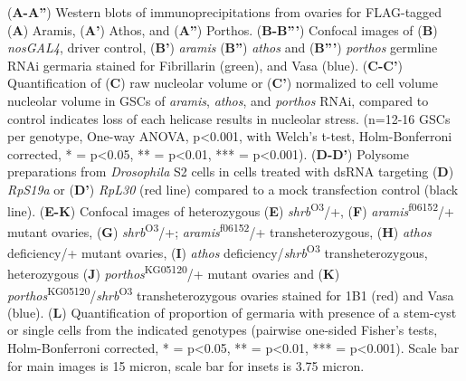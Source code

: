 \documentclass[12pt,oneside]{reedthesis}
\begin{document}
(\textbf{A-A''})
Western blots of immunoprecipitations from ovaries for FLAG-tagged
(\textbf{A}) Aramis, (\textbf{A'}) Athos, and (\textbf{A''}) Porthos. (\textbf{B-B'''})
Confocal images of (\textbf{B}) \emph{nosGAL4}, driver control, (\textbf{B'}) \emph{aramis}
(\textbf{B''}) \emph{athos} and (\textbf{B'''}) \emph{porthos} germline RNAi germaria
stained for Fibrillarin (green), and Vasa (blue). (\textbf{C-C'})
Quantification of (\textbf{C}) raw nucleolar volume or (\textbf{C'}) normalized to
cell volume nucleolar volume in GSCs of \emph{aramis}, \emph{athos}, and \emph{porthos}
RNAi, compared to control indicates loss of each helicase results in
nucleolar stress. (n=12-16 GSCs per genotype, One-way ANOVA, p\textless0.001,
with Welch's t-test, Holm-Bonferroni corrected, * = p\textless0.05, ** =
p\textless0.01, *** = p\textless0.001). (\textbf{D-D'}) Polysome preparations from
\emph{Drosophila} S2 cells in cells treated with dsRNA targeting (\textbf{D})
\emph{RpS19a} or (\textbf{D'}) \emph{RpL30} (red line) compared to a mock transfection
control (black line). (\textbf{E-K}) Confocal images of heterozygous (\textbf{E})
\emph{shrb}\textsuperscript{O3}/+, (\textbf{F}) \emph{aramis}\textsuperscript{f06152}/+ mutant ovaries, (\textbf{G})
\emph{shrb}\textsuperscript{O3}/+; \emph{aramis}\textsuperscript{f06152}/+ transheterozygous, (\textbf{H}) \emph{athos}
deficiency/+ mutant ovaries, (\textbf{I}) \emph{athos} deficiency/\emph{shrb}\textsuperscript{O3}
transheterozygous, heterozygous (\textbf{J}) \emph{porthos}\textsuperscript{KG05120}/+ mutant
ovaries and (\textbf{K}) \emph{porthos}\textsuperscript{KG05120}/\emph{shrb}\textsuperscript{O3} transheterozygous
ovaries stained for 1B1 (red) and Vasa (blue). (\textbf{L}) Quantification of
proportion of germaria with presence of a stem-cyst or single cells from
the indicated genotypes (pairwise one-sided Fisher's tests,
Holm-Bonferroni corrected, * = p\textless0.05, ** = p\textless0.01, *** =
p\textless0.001). Scale bar for main images is 15 micron, scale bar for insets
is 3.75 micron.
\end{document}
